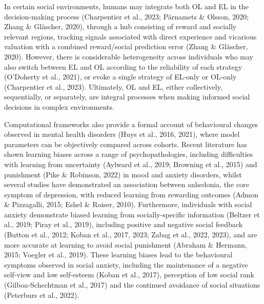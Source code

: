 \documentclass[12pt,a4paper,oneside,]{book} %
\begin{document}
In certain social environments, humans may integrate both OL and EL in the decision-making process (Charpentier et al., 2023; Pärnamets \& Olsson, 2020; Zhang \& Gläscher, 2020), through a hub consisting of reward and socially relevant regions, tracking signals associated with direct experience and vicarious valuation with a combined reward/social prediction error (Zhang \& Gläscher, 2020). However, there is considerable heterogeneity across individuals who may also switch between EL and OL according to the reliability of each strategy (O'Doherty et al., 2021), or evoke a single strategy of EL-only or OL-only (Charpentier et al., 2023). Ultimately, OL and EL, either collectively, sequentially, or separately, are integral processes when making informed social decisions in complex environments.

Computational frameworks also provide a formal account of behavioural changes observed in mental health disorders (Huys et al., 2016, 2021), where model parameters can be objectively compared across cohorts. Recent literature has shown learning biases across a range of psychopathologies, including difficulties with learning from uncertainty (Aylward et al., 2019; Browning et al., 2015) and punishment (Pike \& Robinson, 2022) in mood and anxiety disorders, whilst several studies have demonstrated an association between anhedonia, the core symptom of depression, with reduced learning from rewarding outcomes (Admon \& Pizzagalli, 2015; Eshel \& Roiser, 2010). Furthermore, individuals with social anxiety demonstrate biased learning from socially-specific information (Beltzer et al., 2019; Piray et al., 2019), including positive and negative social feedback (Button et al., 2012; Koban et al., 2017, 2023; Zabag et al., 2022, 2023), and are more accurate at learning to avoid social punishment (Abraham \& Hermann, 2015; Voegler et al., 2019). These learning biases lead to the behavioural symptoms observed in social anxiety, including the maintenance of a negative self-view and low self-esteem (Koban et al., 2017), perception of low social rank (Gilboa-Schechtman et al., 2017) and the continued avoidance of social situations (Peterburs et al., 2022).
\end{document}
